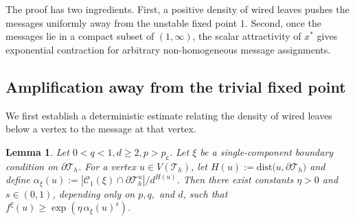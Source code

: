 \documentclass[11pt]{amsart}
\theoremstyle{plain}
\newtheorem{lemma}[theorem]{Lemma}
\theoremstyle{definition}
\theoremstyle{remark}
\newcommand{\dary}{\mathcal T_h}
\newcommand{\pc}{p_{\mathsf{c}}}
\newcommand{\dist}{\mathrm{dist}}
\begin{document}
The proof has two ingredients. First, a positive density of wired leaves pushes the messages uniformly away from the unstable fixed point $1$. Second, once the messages lie in a compact subset of $(1,\infty)$, the scalar attractivity of $x^*$ gives exponential contraction for arbitrary non-homogeneous message assignments.

\subsection{Amplification away from the trivial fixed point}
\label{subsec:amplification}

We first establish a deterministic estimate relating the density of wired leaves below a vertex to the message at that vertex.

\begin{lemma}
\label{lem:density-amplification}
Let $0<q<1, d\ge2, p>\pc$. Let $\xi$ be a single-component boundary condition on $\partial \dary$. For a vertex $u\in V(\dary)$, let $H(u):=\dist\bigl(u,\partial \dary\bigr)$ and define $\alpha_\xi(u):=
\left|
    \mathcal C_1(\xi)
    \cap
    \partial \dary^u
\right| / d^{H(u)}$. 
Then there exist constants $\eta>0$ and $s\in(0,1)$, depending only on $p,q,$ and $d$, such that $    f^\xi(u)\ge\exp\left(\eta\,\alpha_\xi(u)^s\right)$.
\end{lemma}
\end{document}
